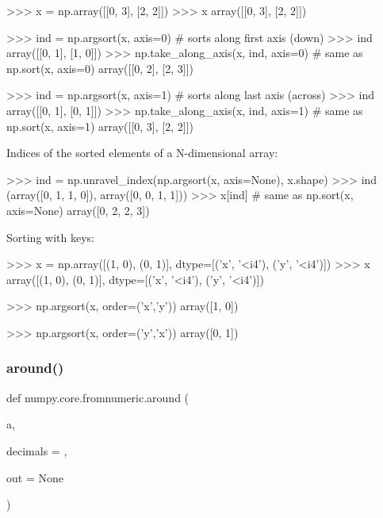 \begin{DoxyVerb}
>>> x = np.array([[0, 3], [2, 2]])
>>> x
array([[0, 3],
       [2, 2]])

>>> ind = np.argsort(x, axis=0)  # sorts along first axis (down)
>>> ind
array([[0, 1],
       [1, 0]])
>>> np.take_along_axis(x, ind, axis=0)  # same as np.sort(x, axis=0)
array([[0, 2],
       [2, 3]])

>>> ind = np.argsort(x, axis=1)  # sorts along last axis (across)
>>> ind
array([[0, 1],
       [0, 1]])
>>> np.take_along_axis(x, ind, axis=1)  # same as np.sort(x, axis=1)
array([[0, 3],
       [2, 2]])

Indices of the sorted elements of a N-dimensional array:

>>> ind = np.unravel_index(np.argsort(x, axis=None), x.shape)
>>> ind
(array([0, 1, 1, 0]), array([0, 0, 1, 1]))
>>> x[ind]  # same as np.sort(x, axis=None)
array([0, 2, 2, 3])

Sorting with keys:

>>> x = np.array([(1, 0), (0, 1)], dtype=[('x', '<i4'), ('y', '<i4')])
>>> x
array([(1, 0), (0, 1)],
      dtype=[('x', '<i4'), ('y', '<i4')])

>>> np.argsort(x, order=('x','y'))
array([1, 0])

>>> np.argsort(x, order=('y','x'))
array([0, 1])\end{DoxyVerb}
 \mbox{\label{namespacenumpy_1_1core_1_1fromnumeric_aa21d3030f7aed764965d201323f85a77}} 
\subsubsection{\texorpdfstring{around()}{around()}}
{\footnotesize\ttfamily def numpy.\+core.\+fromnumeric.\+around (\begin{DoxyParamCaption}\item[{}]{a,  }\item[{}]{decimals = {},  }\item[{}]{out = {\ttfamily None} }\end{DoxyParamCaption})}

